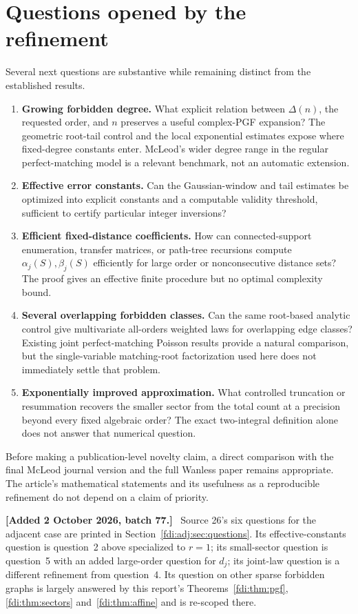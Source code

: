 \documentclass[11pt,letterpaper]{article}
\theoremstyle{remark}\newtheorem{remark}[theorem]{Remark}
\newenvironment{mergenote}[1][2 October 2026, batch 77]{\par\smallskip\begingroup\small\noindent\textbf{[Added #1.]}\ }{\endgroup\par\smallskip}
\begin{document}
\section{Questions opened by the refinement}\label{fdi:sec:questions}
Several next questions are substantive while remaining distinct from the established results.
\begin{enumerate}
\item \textbf{Growing forbidden degree.} What explicit relation between $\Delta(n)$, the requested order, and $n$ preserves a useful complex-PGF expansion? The geometric root-tail control and the local exponential estimates expose where fixed-degree constants enter. McLeod's wider degree range in the regular perfect-matching model is a relevant benchmark, not an automatic extension.
\item \textbf{Effective error constants.} Can the Gaussian-window and tail estimates be optimized into explicit constants and a computable validity threshold, sufficient to certify particular integer inversions?
\item \textbf{Efficient fixed-distance coefficients.} How can connected-support enumeration, transfer matrices, or path-tree recursions compute $\alpha_j(S),\beta_j(S)$ efficiently for large order or nonconsecutive distance sets? The proof gives an effective finite procedure but no optimal complexity bound.
\item \textbf{Several overlapping forbidden classes.} Can the same root-based analytic control give multivariate all-orders weighted laws for overlapping edge classes? Existing joint perfect-matching Poisson results provide a natural comparison, but the single-variable matching-root factorization used here does not immediately settle that problem.
\item \textbf{Exponentially improved approximation.} What controlled truncation or resummation recovers the smaller sector from the total count at a precision beyond every fixed algebraic order? The exact two-integral definition alone does not answer that numerical question.
\end{enumerate}
Before making a publication-level novelty claim, a direct comparison with the final McLeod journal version and the full Wanless paper remains appropriate. The article's mathematical statements and its usefulness as a reproducible refinement do not depend on a claim of priority.

\begin{mergenote}
Source 26's six questions for the adjacent case are printed in Section~\ref{fdi:adj:sec:questions}. Its effective-constants question is question~2 above specialized to $r=1$; its small-sector question is question~5 with an added large-order question for $d_j$; its joint-law question is a different refinement from question~4. Its question on other sparse forbidden graphs is largely answered by this report's Theorems~\ref{fdi:thm:pgf}, \ref{fdi:thm:sectors} and~\ref{fdi:thm:affine} and is re-scoped there.
\end{mergenote}
\end{document}
